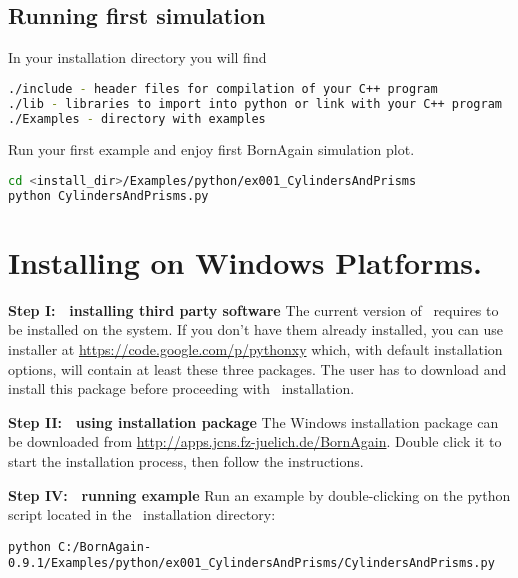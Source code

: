 \subsection{Running first simulation}

In your installation directory you will find
\begin{lstlisting}[language=bash, style=commandline]
./include - header files for compilation of your C++ program
./lib - libraries to import into python or link with your C++ program
./Examples - directory with examples
\end{lstlisting}

Run your first example and enjoy first BornAgain simulation plot.
\begin{lstlisting}[language=bash, style=commandline]
cd <install_dir>/Examples/python/ex001_CylindersAndPrisms
python CylindersAndPrisms.py
\end{lstlisting}




\section{Installing on Windows Platforms.} 


\noindent
{\bf Step I: $~$ installing third party software} \newline
The current version of \BornAgain\ requires  
to be installed on the system. If you don't have them already installed,
you can use  installer
at \url{https://code.google.com/p/pythonxy} which, with default installation options, will contain at least these three packages.
The user has to download and install this package before proceeding with
\BornAgain\ installation.
\vspace*{2mm}

\noindent
{\bf Step II: $~$ using installation package } \newline
The Windows installation package can be downloaded from \url{http://apps.jcns.fz-juelich.de/BornAgain}.
Double click it to start the installation process, then follow the instructions.
\vspace*{2mm}

\noindent
{\bf Step IV: $~$ running example} \newline
Run an example by double-clicking on the python script located in the \BornAgain\ installation directory:
\begin{lstlisting}[language=shell, style=commandline]
python C:/BornAgain-0.9.1/Examples/python/ex001_CylindersAndPrisms/CylindersAndPrisms.py
\end{lstlisting}





